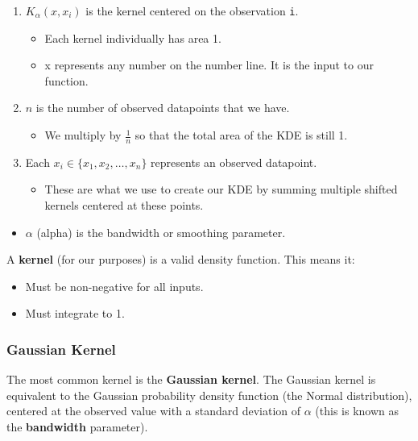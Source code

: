 \documentclass[
  letterpaper,
  DIV=11,
  numbers=noendperiod]{scrreprt}
\providecommand{\tightlist}{%
  \setlength{\itemsep}{0pt}\setlength{\parskip}{0pt}}\usepackage{longtable,booktabs,array}
\begin{document}
\begin{enumerate}
\def\labelenumi{\arabic{enumi}.}
\tightlist
\item
  \(K_{\alpha}(x, x_i)\) is the kernel centered on the observation
  \texttt{i}.

  \begin{itemize}
  \tightlist
  \item
    Each kernel individually has area 1.
  \item
    x represents any number on the number line. It is the input to our
    function.
  \end{itemize}
\item
  \(n\) is the number of observed datapoints that we have.

  \begin{itemize}
  \tightlist
  \item
    We multiply by \(\frac{1}{n}\) so that the total area of the KDE is
    still 1.
  \end{itemize}
\item
  Each \(x_i \in \{x_1, x_2, \dots, x_n\}\) represents an observed
  datapoint.

  \begin{itemize}
  \tightlist
  \item
    These are what we use to create our KDE by summing multiple shifted
    kernels centered at these points.
  \end{itemize}
\end{enumerate}

\begin{itemize}
\tightlist
\item
  \(\alpha\) (alpha) is the bandwidth or smoothing parameter.
\end{itemize}

A \textbf{kernel} (for our purposes) is a valid density function. This
means it:

\begin{itemize}
\tightlist
\item
  Must be non-negative for all inputs.
\item
  Must integrate to 1.
\end{itemize}

\subsubsection{Gaussian Kernel}\label{gaussian-kernel}

The most common kernel is the \textbf{Gaussian kernel}. The Gaussian
kernel is equivalent to the Gaussian probability density function (the
Normal distribution), centered at the observed value with a standard
deviation of \(\alpha\) (this is known as the \textbf{bandwidth}
parameter).
\end{document}
